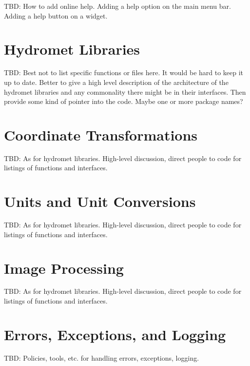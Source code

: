 TBD: How to add online help.  Adding a help option on the main
menu bar.  Adding a help button on a widget.


\section{Hydromet Libraries}

TBD:  Best not to list specific functions or files here.  It 
would be hard to keep it up to date.  Better to give a high
level description of the architecture of the hydromet libraries
and any commonality there might be in their interfaces.  Then 
provide some kind of pointer into the code.  Maybe one or more
package names?

\section{Coordinate Transformations}

TBD: As for hydromet libraries.  High-level discussion, direct
people to code for listings of functions and interfaces.

\section{Units and Unit Conversions}

TBD: As for hydromet libraries.  High-level discussion, direct
people to code for listings of functions and interfaces.

\section{Image Processing}

TBD: As for hydromet libraries.  High-level discussion, direct
people to code for listings of functions and interfaces.

\section{Errors, Exceptions, and Logging}

TBD: Policies, tools, etc. for handling errors, exceptions, logging.






